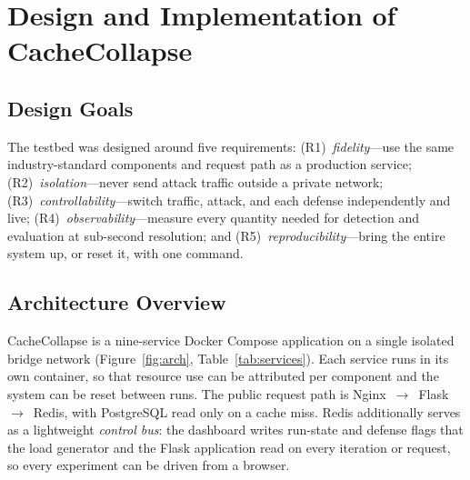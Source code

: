 \section{Design and Implementation of CacheCollapse}
\label{sec:design}

\subsection{Design Goals}
The testbed was designed around five requirements: (R1)~\emph{fidelity}---use the same
industry-standard components and request path as a production service;
(R2)~\emph{isolation}---never send attack traffic outside a private network;
(R3)~\emph{controllability}---switch traffic, attack, and each defense independently
and live; (R4)~\emph{observability}---measure every quantity needed for detection and
evaluation at sub-second resolution; and (R5)~\emph{reproducibility}---bring the entire
system up, or reset it, with one command.

\subsection{Architecture Overview}
CacheCollapse is a nine-service Docker Compose application on a single isolated bridge
network (Figure~\ref{fig:arch}, Table~\ref{tab:services}). Each service runs in its
own container, so that resource use can be attributed per component and the system
can be reset between runs. The public request path is
Nginx~$\rightarrow$~Flask~$\rightarrow$~Redis, with PostgreSQL read only on a cache
miss. Redis additionally serves as a lightweight \emph{control bus}: the dashboard
writes run-state and defense flags that the load generator and the Flask application
read on every iteration or request, so every experiment can be driven from a browser.

